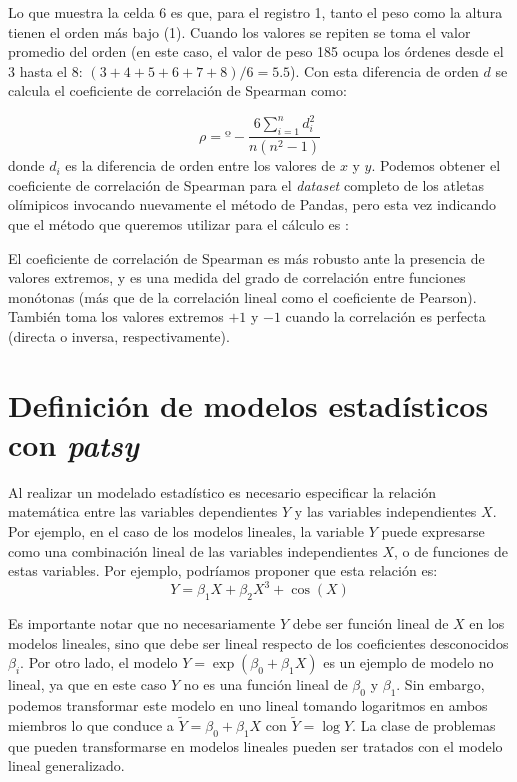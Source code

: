 
Lo que muestra la celda 6 es que, para el registro 1, tanto el peso como la altura tienen el orden más bajo (1). Cuando los valores se repiten se toma el valor promedio del orden (en este caso, el valor de peso 185 ocupa los órdenes desde el 3 hasta el 8:  $(3+4+5+6+7+8)/6=5.5$). Con esta diferencia de orden $d$ se calcula el coeficiente de correlación de Spearman como:

\[ \rho = º - \frac{6 \sum\limits_{i=1}^n d_i^2}{n(n^2-1)}  \]
donde $d_i$ es la diferencia de orden entre los valores de $x$ y $y$. Podemos obtener el coeficiente de correlación de Spearman para el \textit{dataset} completo de los atletas olímipicos invocando nuevamente el método  de Pandas, pero esta vez indicando que el método que queremos utilizar para el cálculo es :


El coeficiente de correlación de Spearman es más robusto ante la presencia de valores extremos, y es una medida del grado de correlación entre funciones monótonas (más que de la correlación lineal como el coeficiente de Pearson). También toma los valores extremos $+1$ y $-1$ cuando la correlación es perfecta (directa o inversa, respectivamente).


\section{Definición de modelos estadísticos con \textit{patsy}}

Al realizar un modelado estadístico es necesario especificar la relación matemática entre las variables dependientes $Y$ y las variables independientes $X$. Por ejemplo, en el caso de los modelos lineales, la variable $Y$ puede expresarse como una combinación lineal de las variables independientes $X$, o de funciones de estas variables. Por ejemplo, podríamos proponer que esta relación es:
\[ Y = \beta_1 X + \beta_2 X^3 + \cos(X)  \]

Es importante notar que no necesariamente $Y$ debe ser función lineal de $X$ en los modelos lineales, sino que debe ser lineal respecto de los coeficientes desconocidos $\beta_i$. Por otro lado, el modelo $Y = \exp(\beta_0 + \beta_1 X)$ es un ejemplo de modelo no lineal, ya que en este caso $Y$ no es una función lineal de $\beta_0$ y $\beta_1$. Sin embargo, podemos transformar este modelo en uno lineal tomando logaritmos en ambos miembros lo que conduce a $\widetilde{Y} = \beta_0 + \beta_1 X$ con $\widetilde{Y} = \log{Y}$. La clase de problemas que pueden transformarse en modelos lineales pueden ser tratados con el modelo lineal generalizado.

